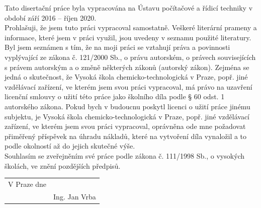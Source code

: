 
\clearpage
\thispagestyle{empty} 
 \vspace*{1cm}
 \noindent 
 Tato disertační práce byla vypracována na Ústavu počítačové a řídicí techniky
v období září 2016 -- říjen 2020. \\ [30mm]
Prohlašuji, že jsem tuto práci vypracoval samostatně. Veškeré literární prameny
a informace, které jsem v práci využil, jsou uvedeny v seznamu použité literatury. \\ [8mm]
Byl jsem seznámen s tím, že na moji práci se vztahují práva a povinnosti vyplývající
ze zákona č. 121/2000 Sb., o právu autorském, o právech souvisejících s právem
autorským a o změně některých zákonů (autorský zákon). Zejména se jedná
o skutečnost, že Vysoká škola chemicko-technologická v Praze, popř. jiné vzdělávací
zařízení, ve kterém jsem svou práci vypracoval, má právo na uzavření licenční
smlouvy o užití této práce jako školního díla podle § 60 odst. 1 autorského zákona.
Pokud bych v budoucnu poskytl licenci o užití práce jinému subjektu, je Vysoká
škola chemicko-technologická v Praze, popř. jiné vzdělávací zařízení, ve kterém
jsem svou práci vypracoval, oprávněna ode mne požadovat přiměřený příspěvek
na úhradu nákladů, které na vytvoření díla vynaložil a to podle okolností až do
jejich skutečné výše. \\ [8mm]
\noindent
Souhlasím se zveřejněním své práce podle zákona č. 111/1998 Sb., o vysokých
školách, ve znění pozdějších předpisů. \\ [30mm]


\noindent\begin{tabular}{@{}p{2.5in}p{}@{}}
\hspace{1cm} V Praze dne                      &\hspace{2cm} \dotfill\\
             & \multicolumn{1}{c}{\hphantom{hhhhHHHHH}Ing. Jan Vrba}\\
\end{tabular} 

 
\cleardoublepage
\thispagestyle{empty}

